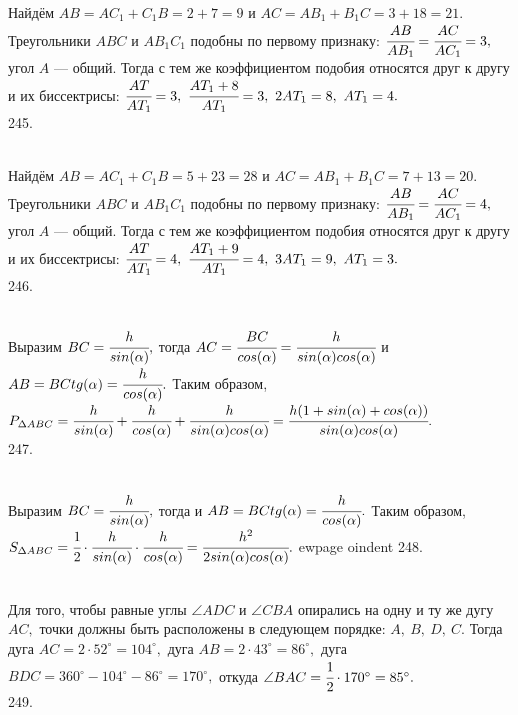 Найдём $AB=AC_1+C_1B=2+7=9$ и $AC=AB_1+B_1C=3+18=21.$ Треугольники $ABC$ и $AB_1C_1$ подобны по первому признаку: $\cfrac{AB}{AB_1}=\cfrac{AC}{AC_1}=3,$ угол $A$ --- общий. Тогда с тем же коэффициентом подобия относятся друг к другу и их биссектрисы: $\cfrac{AT}{AT_1}=3,\ \cfrac{AT_1+8}{AT_1}=3,\ 2AT_1=8,\ AT_1=4.$\\
245. \begin{figure}[ht!]
\end{figure}\\
Найдём $AB=AC_1+C_1B=5+23=28$ и $AC=AB_1+B_1C=7+13=20.$ Треугольники $ABC$ и $AB_1C_1$ подобны по первому признаку: $\cfrac{AB}{AB_1}=\cfrac{AC}{AC_1}=4,$ угол $A$ --- общий. Тогда с тем же коэффициентом подобия относятся друг к другу и их биссектрисы: $\cfrac{AT}{AT_1}=4,\ \cfrac{AT_1+9}{AT_1}=4,\ 3AT_1=9,\ AT_1=3.$\\
246. \begin{figure}[ht!]
\end{figure}\\
Выразим $BC=\cfrac{h}{sin(\alpha)},$ тогда $AC=\cfrac{BC}{cos(\alpha)}=\cfrac{h}{sin(\alpha)cos(\alpha)}$ и $AB=BC tg(\alpha)=\cfrac{h}{cos(\alpha)}.$ Таким образом, $P_{\Delta ABC}=\cfrac{h}{sin(\alpha)}+\cfrac{h}{cos(\alpha)}+\cfrac{h}{sin(\alpha)cos(\alpha)}=
\cfrac{h(1+sin(\alpha)+cos(\alpha))}{sin(\alpha)cos(\alpha)}.$\\
247. \begin{figure}[ht!]
\end{figure}\\
Выразим $BC=\cfrac{h}{sin(\alpha)},$ тогда и $AB=BC tg(\alpha)=\cfrac{h}{cos(\alpha)}.$ Таким образом, $S_{\Delta ABC}=
\cfrac{1}{2}\cdot\cfrac{h}{sin(\alpha)}\cdot\cfrac{h}{cos(\alpha)}=
\cfrac{h^2}{2sin(\alpha)cos(\alpha)}.$
ewpage
oindent
248. \begin{figure}[ht!]
\end{figure}\\
Для того, чтобы равные углы $\angle ADC$ и $\angle CBA$ опирались на одну и ту же дугу $AC,$ точки должны быть расположены в следующем порядке: $A,\ B,\ D,\ C.$ Тогда дуга $AC=2\cdot 52^\circ=104^\circ,$ дуга $AB=2\cdot43^\circ=86^\circ,$ дуга $BDC=360^\circ-104^\circ-86^\circ=170^\circ,$ откуда $\angle BAC=\cfrac{1}{2}\cdot 170^\circ=85^\circ.$\\
249. \begin{figure}[ht!]
\end{figure}\\
